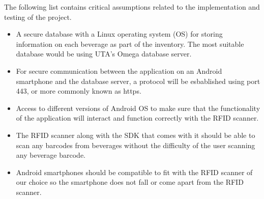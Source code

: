 The following list contains critical assumptions related to the implementation and testing of the project.

\begin{itemize}
  \item A secure database with a Linux operating system (OS) for storing information on each beverage as part of the inventory.  The most         suitable database would be using UTA's Omega database server.
  \item For secure communication between the application on an Android smartphone and the database server, a protocol will be esbablished         using port 443, or more commonly known as https.
  \item Access to different versions of Android OS to make sure that the functionality of the application will interact and function                correctly with the RFID scanner.
  \item The RFID scanner along with the SDK that comes with it should be able to scan any barcodes from beverages without the difficulty           of the user scanning any beverage barcode.
  \item Android smartphones should be compatible to fit with the RFID scanner of our choice so the smartphone does not fall or come apart         from the RFID scanner.
\end{itemize}
